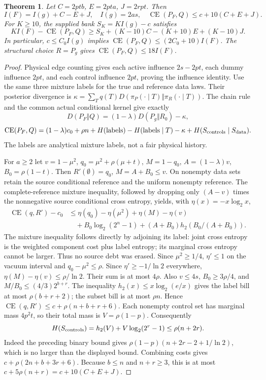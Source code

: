 \documentclass[11pt]{article}
\newtheorem{theorem}[lemma]{Theorem}
\begin{document}
\begin{theorem}\label{thm:floor}
Let $C=2ptb$, $E=2pta$, $J=2rpt$. Then
\[
 I(F)=I(g)+C-E+J,\quad I(g)=2as,\quad
 \operatorname{CE}(P_F,Q)\le c+10(C+E+J).
\]
For $K\ge10$, the supplied bank $S_K=KI(g)-c$ satisfies
\[
 KI(F)-\operatorname{CE}(P_F,Q)
 \ge S_K+(K-10)C-(K+10)E+(K-10)J.
\]
In particular, $c\le C_0I(g)$ implies
$\operatorname{CE}(P_F,Q)\le(2C_0+10)I(F)$. The structural choice
$R=P_g$ gives $\operatorname{CE}(P_F,Q)\le18I(F)$.
\end{theorem}
\begin{proof}
Physical edge counting gives each active influence $2s-2pt$, each dummy
influence $2pt$, and each control influence $2pt$, proving the influence
identity. Use the same three mixture labels for the true and reference
data laws. Their posterior divergence is
$\kappa=\sum_Tq(T)D(\pi_P(\cdot\mid T)\Vert\pi_R(\cdot\mid T))$.
The chain rule and the common actual conditional kernel give exactly
\[
 D(P_F\Vert Q)=(1-\lambda)D(P_g\Vert R_0)-\kappa,
\]
\[
 \operatorname{CE}(P_F,Q)=(1-\lambda)c_0+\rho n+
 H(\text{labels})-H(\text{labels}\mid T)-\kappa+
 H(S_{\rm controls}\mid S_{\rm data}).
\]
The labels are analytical mixture labels, not a fair physical history.

For $a\ge2$ let $v=1-\mu^2$, $q_0=\mu^2+\rho(\mu+t)$,
$M=1-q_0$, $A=(1-\lambda)v$, $B_0=\rho(1-t)$.
Then $R'(\emptyset)=q_0$, $M=A+B_0\le v$.
On nonempty data sets retain the source conditional reference and the
uniform nonempty reference. The complete-reference mixture inequality,
followed by dropping only $(A-v)$ times the nonnegative source conditional
cross entropy, yields, with $\eta(x)=-x\log_2x$,
\begin{align*}
 \operatorname{CE}(q,R')-c_0
 &\le\eta(q_0)-\eta(\mu^2)+\eta(M)-\eta(v)\\
 &\quad+B_0\log_2(2^n-1)+(A+B_0)h_2(B_0/(A+B_0)).
\end{align*}
The mixture inequality follows directly by adjoining its label: joint
cross entropy is the weighted component cost plus label entropy; its
marginal cross entropy cannot be larger. Thus no source debt was erased.
Since $\mu^2\ge1/4$, $\eta'\le1$ on the vacuum interval and
$q_0-\mu^2\le\rho$. Since $\eta'\ge-1/\ln2$ everywhere,
$\eta(M)-\eta(v)\le\rho/\ln2$. Their sum is at most $4\rho$.
Also $v\le4s$, $B_0\ge3\rho/4$, and
$M/B_0\le(4/3)2^{b+r}$. The inequality
$h_2(x)\le x\log_2(e/x)$ gives the label bill at most
$\rho(b+r+2)$; the subset bill is at most $\rho n$.
Hence $\operatorname{CE}(q,R')\le c+\rho(n+b+r+6)$.
Each nonempty control set has marginal mass $4p^2t$, so their total mass
is $V=\rho(1-p)$. Consequently
\[
 H(S_{\rm controls})=h_2(V)+V\log_2(2^r-1)
 \le\rho(n+2r).
\]
Indeed the preceding binary bound gives
$\rho(1-p)(n+2r-2+1/\ln2)$, which is no larger than the displayed
bound. Combining costs gives $c+\rho(2n+b+3r+6)$.
Because $b\le n$ and $n+r\ge3$, this is at most
$c+5\rho(n+r)=c+10(C+E+J)$.


\end{proof}
\end{document}
